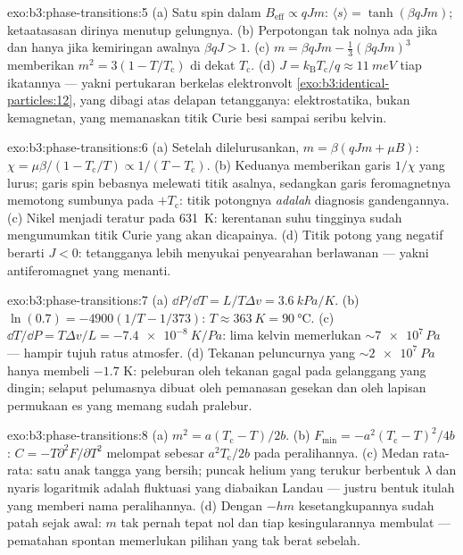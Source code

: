 \begin{solution}{exo:b3:phase-transitions:5}
(a) Satu spin dalam $B_{\text{eff}} \propto qJm$: $\langle s\rangle =
\tanh(\beta qJm)$; ketaatasasan dirinya menutup gelungnya. (b) Perpotongan
tak nolnya ada jika dan hanya jika kemiringan awalnya $\beta qJ > 1$. (c) $m =
\beta qJm - \tfrac13(\beta qJm)^3$ memberikan $m^2 = 3(1 -
T/T_{\text{c}})$ di dekat $T_{\text{c}}$. (d) $J =
k_{\text{B}}T_{\text{c}}/q \approx \qty{11}{meV}$ tiap ikatannya ---
yakni pertukaran berkelas elektronvolt
\cref{exo:b3:identical-particles:12}, yang dibagi atas delapan
tetangganya: elektrostatika, bukan kemagnetan, yang memanaskan titik
Curie besi sampai seribu kelvin.
\end{solution}

\begin{solution}{exo:b3:phase-transitions:6}
(a) Setelah dilelurusankan, $m = \beta(qJm + \mu B)$: $\chi =
\mu\beta/(1 - T_{\text{c}}/T) \propto 1/(T - T_{\text{c}})$. (b)
Keduanya memberikan garis $1/\chi$ yang lurus; garis spin bebasnya
melewati titik asalnya, sedangkan garis feromagnetnya memotong sumbunya pada
$+T_{\text{c}}$: titik potongnya \emph{adalah} diagnosis
gandengannya. (c) Nikel menjadi teratur pada \qty{631}{K}: kerentanan
suhu tingginya sudah mengumumkan titik Curie yang akan dicapainya.
(d) Titik potong yang negatif berarti $J < 0$: tetangganya lebih
menyukai penyearahan berlawanan --- yakni antiferomagnet yang menanti.
\end{solution}

\begin{solution}{exo:b3:phase-transitions:7}
(a) $\dd P/\dd T = L/T\Delta v = \qty{3.6}{kPa/K}$. (b)
$\ln(0.7) = -4900(1/T - 1/373)$: $T \approx \qty{363}{K} =
\qty{90}{\celsius}$. (c) $\dd T/\dd P = T\Delta v/L =
\qty{-7.4e-8}{K/Pa}$: lima kelvin memerlukan $\sim\num{7e7}\,\unit{Pa}$
--- hampir tujuh ratus atmosfer. (d) Tekanan peluncurnya yang
$\sim\qty{2e7}{Pa}$ hanya membeli $-1.7$ K: peleburan oleh tekanan gagal
pada gelanggang yang dingin; selaput pelumasnya dibuat oleh pemanasan
gesekan dan oleh lapisan permukaan es yang memang sudah pralebur.
\end{solution}

\begin{solution}{exo:b3:phase-transitions:8}
(a) $m^2 = a(T_{\text{c}} - T)/2b$. (b) $F_{\min} =
-a^2(T_{\text{c}} - T)^2/4b$: $C = -T\partial^2F/\partial T^2$
melompat sebesar $a^2T_{\text{c}}/2b$ pada peralihannya. (c) Medan
rata-rata: satu anak tangga yang bersih; puncak helium yang terukur
berbentuk $\lambda$ dan nyaris logaritmik adalah fluktuasi yang diabaikan
Landau --- justru bentuk itulah yang memberi nama peralihannya. (d)
Dengan $-hm$ kesetangkupannya sudah patah sejak awal:
$m$ tak pernah tepat nol dan tiap kesingularannya
membulat --- pematahan spontan memerlukan pilihan yang tak berat sebelah.
\end{solution}

